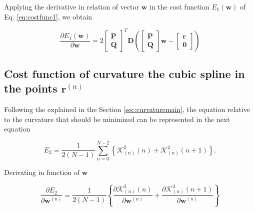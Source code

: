 Applying the derivative in relation of vector $\mathbf{w}$
\cite[pp. 11]{petersen2008matrix}
in the cost function $E_{1}(\mathbf{w})$ of Eq. \ref{eq:costfunc1}, 
we obtain

\begin{equation}\label{eq:DE1}
\frac{\partial E_{1}(\mathbf{w})}{\partial \mathbf{w}}
=
2
\begin{bmatrix}
\mathbf{P}\\
\mathbf{Q}
\end{bmatrix}^{T}
\mathbf{D}
\left(
\begin{bmatrix}
\mathbf{P}\\
\mathbf{Q}
\end{bmatrix}
\mathbf{w}
-
\begin{bmatrix}
\mathbf{r}\\
\mathbf{0}
\end{bmatrix}
\right)
\end{equation}

\subsection{Cost function of curvature the cubic spline in the points $\mathbf{r}^{(n)}$}

Following the explained in the Section \ref{sec:curvaturemain},
the equation relative to the curvature that should be minimized can be represented in the next equation

\begin{equation}
E_{2}
=
\frac{1}{2(N-1)}
\sum\limits_{n=0}^{N-2}
\left\{
\mathcal{K}_{(n)}^{2}(n)
+
\mathcal{K}_{(n)}^{2}(n+1)
\right\}.
\end{equation}

Derivating in function of $\mathbf{w}$

\begin{equation}
\frac{\partial E_{2}}{\partial \mathbf{w}^{(n)}}
=
\frac{1}{2(N-1)}
\left\{
\frac{
\partial 
\mathcal{K}_{(n)}^{2}(n)
}{\partial \mathbf{w}^{(n)}}
+
\frac{
\partial 
\mathcal{K}_{(n)}^{2}(n+1)
}{\partial \mathbf{w}^{(n)}}
\right\}
\end{equation}

